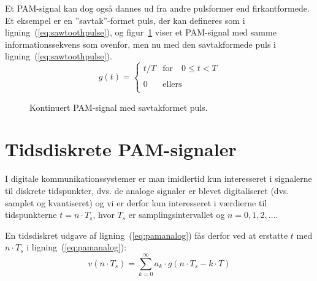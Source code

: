 \documentclass[dvips,11pt,a4paper]{article}
\begin{document}
Et PAM-signal kan dog også dannes ud fra andre pulsformer end firkantformede. Et eksempel er en ''savtak''-formet puls, der kan defineres som i ligning~(\ref{eq:sawtoothpulse}), og figur~\ref{fig:pam001c} viser et PAM-signal med samme informationssekvens som ovenfor, men nu med den savtakformede puls i ligning~(\ref{eq:sawtoothpulse}).
\begin{equation}
g(t) = \left\{
\begin{array}{ll}
t/T & \mathrm{for}\quad{}0 \le t < T \\
& \\
0 & \mathrm{ellers}\\
\end{array}
\right.
\label{eq:sawtoothpulse}
\end{equation}
\begin{figure}[htbp]
\centering
{}
\caption{\label{fig:pam001c}Kontinuert PAM-signal med savtakformet puls.}
\end{figure}

\section{Tidsdiskrete PAM-signaler}
I digitale kommunikationssystemer er man imidlertid kun interesseret i signalerne til diskrete tidspunkter, dvs. de analoge signaler er blevet digitaliseret (dvs. samplet og kvantiseret) og vi er derfor kun interesseret i værdierne til tidspunkterne $t = n \cdot T_{s}$, hvor $T_s$ er samplingsintervallet og $n = 0,1,2,\ldots$. 

En tidsdiskret udgave af ligning~(\ref{eq:pamanalog}) fås derfor ved at erstatte $t$ med $n \cdot T_s$ i ligning~(\ref{eq:pamanalog}):
\begin{equation}
v(n \cdot T_{s})=\sum_{k=0}^{\infty} a_{k} \cdot g(n \cdot T_{s}-k \cdot T)
\label{eq:pamdiskret2}
\end{equation}
\end{document}
